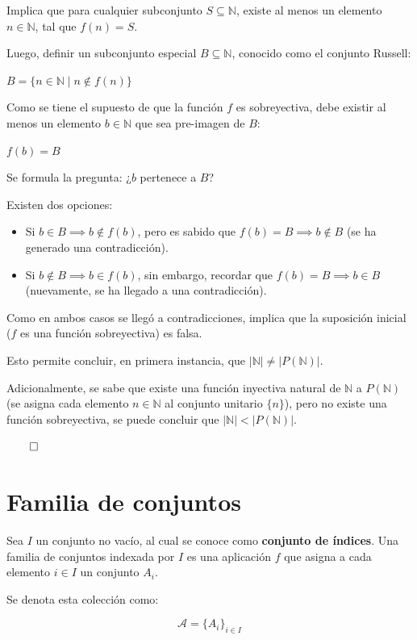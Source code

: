 \documentclass{article}
\begin{document}
Implica que para cualquier subconjunto $S \subseteq \mathbb{N}$, existe al menos un elemento $n \in \mathbb{N}$, tal que $f(n) = S$.

Luego, definir un subconjunto especial $B \subseteq \mathbb{N}$, conocido como el conjunto Russell:

$B = \{n \in \mathbb{N} \mid n \notin f(n)\}$

Como se tiene el supuesto de que la función $f$ es sobreyectiva, debe existir al menos un elemento $b \in \mathbb{N}$ que sea pre-imagen de $B$:

$f(b) = B$

Se formula la pregunta: ¿$b$ pertenece a $B$?

Existen dos opciones:

\begin{itemize}
    \item Si $b \in B \implies b \notin f(b)$, pero es sabido que $f(b) = B \implies b \notin B$ (se ha generado una contradicción).
    \item Si $b \notin B \implies b \in f(b)$, sin embargo, recordar que $f(b) = B \implies b \in B$ (nuevamente, se ha llegado a una contradicción).
\end{itemize}

Como en ambos casos se llegó a contradicciones, implica que la suposición inicial ($f$ es una función sobreyectiva) es falsa.

Esto permite concluir, en primera instancia, que $\left|\mathbb{N}\right| \neq \left|P(\mathbb{N})\right|$.

Adicionalmente, se sabe que existe una función inyectiva natural de $\mathbb{N}$ a $P(\mathbb{N})$ (se asigna cada elemento $n \in \mathbb{N}$ al conjunto unitario $\{n\}$), pero no existe una función sobreyectiva, se puede concluir que $\left|\mathbb{N}\right| < \left|P(\mathbb{N})\right|$.

$\qed$

\section{Familia de conjuntos}

Sea $I$ un conjunto no vacío, al cual se conoce como \textbf{conjunto de índices}. Una familia de conjuntos indexada por $I$ es una aplicación $f$ que asigna a cada elemento $i \in I$ un conjunto $A_i$.

Se denota esta colección como:

\[ \mathcal{A} = \{A_i\}_{i \in I} \]
\end{document}

